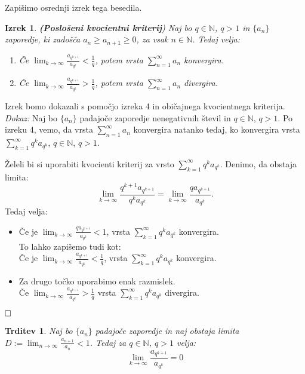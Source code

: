 \documentclass[a4paper,12pt]{article}
\def\N{\mathbb{N}} %
\def\qed{$\hfill\Box$}   %
\newtheorem{izrek}{Izrek}
\newtheorem{trditev}{Trditev}
\begin{document}
Zapišimo osrednji izrek tega besedila.

\begin{izrek}\textbf{(Poslošeni kvocientni kriterij})
    Naj bo $q \in \N$, $q > 1$ in $\{a_n\}$ zaporedje,
    ki zadošča $a_{n} \geq a_{n+1} \geq 0$, za vsak $n \in \N$.
    Tedaj velja:
    
    \begin{enumerate}
        \item Če $\lim_{k \to \infty}{\frac{a_{q^{k + 1}}}{a_{q^k}}} < \frac{1}{q}$,
        potem vrsta $\sum_{n = 1}^{\infty}{a_n}$ konvergira.
        \item Če $\lim_{k \to \infty}{\frac{a_{q^{k + 1}}}{a_{q^k}}} > \frac{1}{q}$,
        potem vrsta $\sum_{n = 1}^{\infty}{a_n}$ divergira.
    \end{enumerate}
\end{izrek}

\noindent
Izrek bomo dokazali s pomočjo izreka 4 in običajnega kvocientnega kriterija.\\
\noindent
{\em Dokaz:\/} Naj bo $\{a_n\}$ padajoče zaporedje nenegativnih števil in $ q \in {\mathbb{N}}$, $q > 1$.
Po izreku 4, vemo, da vrsta $\sum_{n = 1}^{\infty}{a_n}$ konvergira natanko tedaj, ko konvergira vrsta
$\sum_{k = 1}^{\infty}{q^ka_{q^k}}$, $q \in {\mathbb{N}}$, $q > 1$.

Želeli bi si uporabiti kvocienti kriterij za vrsto $\sum_{k = 1}^{\infty}{q^ka_{q^k}}$.
Denimo, da obstaja limita:
\[ 
    \lim_{k \to \infty}{\frac{q^{k + 1}a_{q^{k + 1}}}{q^ka_{q^k}}}  =
    \lim_{k \to \infty}{\frac{qa_{q^{k + 1}}}{a_{q^k}}}  
    \text{.}
\]
Tedaj velja:
\begin{itemize}
    \item Če je $\lim_{k \to \infty}{\frac{qa_{q^{k + 1}}}{a_{q^k}}} < 1$, vrsta $\sum_{k = 1}^{\infty}{q^ka_{q^k}}$ konvergira.\\
    To lahko zapišemo tudi kot:\\
    Če je $\lim_{k \to \infty}{\frac{a_{q^{k + 1}}}{a_{q^k}}} < \frac{1}{q}$, vrsta $\sum_{k = 1}^{\infty}{q^ka_{q^k}}$ konvergira.
    \item Za drugo točko uporabimo enak razmislek.\\
    Če $\lim_{k \to \infty}{\frac{a_{q^{k + 1}}}{a_{q^k}}} > \frac{1}{q}$
    vrsta $\sum_{k = 1}^{\infty}{q^ka_{q^k}}$ divergira. 
\end{itemize}
\qed


\begin{trditev}
    Naj bo $\{a_{n}\}$ padajoče zaporedje in naj obstaja limita
    $D := \lim_{n \to \infty}{\frac{a_{n + 1}}{a_n}} < 1$. Tedaj za $q \in {\mathbb{N}}$, $q > 1$ velja:
    \[
        \lim_{k \to \infty}{\frac{a_{q^{k + 1}}}{a_{q^k}}} = 0
    \]
\end{trditev}
\end{document}
